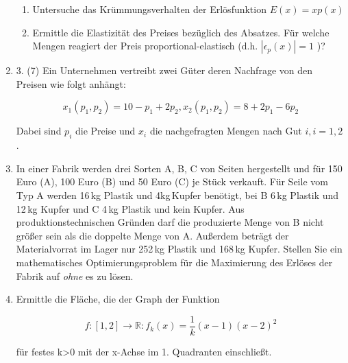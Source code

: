 \documentclass[12pt,a4paper]{scrreprt}
\newcommand{\R}{\mathds{R}}
\begin{document}
\begin{enumerate}
\begin{enumerate}
\item 
Untersuche das Krümmungsverhalten der Erlösfunktion $E(x)=xp(x)$

\item 
Ermittle die Elastizität des Preises bezüglich des Absatzes. Für welche Mengen reagiert der Preis proportional-elastisch (d.h. $|\epsilon_p(x)|=1$ )? 

\end{enumerate}

\item 3. (7)
Ein Unternehmen vertreibt zwei Güter deren Nachfrage von den Preisen wie folgt anhängt:

\[
x_1(p_1, p_2) = 10 - p_1 + 2p_2
,
x_2(p_1, p_2) = 8 + 2p_1 - 6p_2
\]

Dabei sind $p_i$ die Preise und $x_i$ die nachgefragten Mengen nach Gut $i, i={1,2}$. 

\item %
In einer Fabrik werden drei Sorten A, B, C von Seiten hergestellt und für 150 Euro (A), 100 Euro (B) und 50 Euro (C) je Stück verkauft.
Für Seile vom Typ A werden 16\,kg Plastik und 4kg\,Kupfer benötigt, bei B 6\,kg Plastik und 12\,kg Kupfer und C 4\,kg Plastik und kein Kupfer.
Aus produktionstechnischen Gründen darf die produzierte Menge von B nicht größer sein als die doppelte Menge von A.
Außerdem beträgt der Materialvorrat im Lager nur 252\,kg Plastik und 168\,kg Kupfer.
Stellen Sie ein mathematisches Optimierungsproblem für die Maximierung des Erlöses der Fabrik auf \emph{ohne} es zu lösen.


\item %
Ermittle die Fläche, die der Graph der Funktion

\[
f: [1,2] \rightarrow \R: f_k(x)=\frac{1}{k} (x-1)(x-2)^2
\]

für festes k>0 mit der x-Achse im 1. Quadranten
einschließt.


\end{enumerate}
\end{document}

